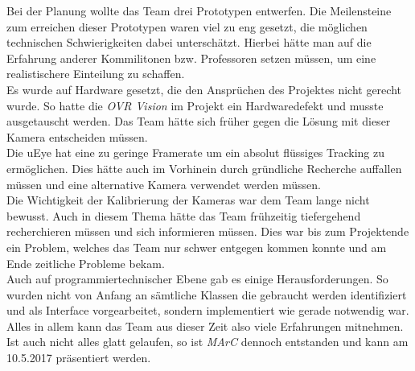 Bei der Planung wollte das Team drei Prototypen entwerfen. Die Meilensteine zum erreichen dieser Prototypen waren viel zu eng gesetzt, die möglichen technischen Schwierigkeiten dabei unterschätzt. Hierbei hätte man auf die Erfahrung anderer Kommilitonen bzw. Professoren setzen müssen, um eine realistischere Einteilung zu schaffen.\\
Es wurde auf Hardware gesetzt, die den Ansprüchen des Projektes nicht gerecht wurde. So hatte die \textit{OVR Vision} im Projekt ein Hardwaredefekt und musste ausgetauscht werden. Das Team hätte sich früher gegen die Lösung mit dieser Kamera entscheiden müssen.\\
Die uEye hat eine zu geringe Framerate um ein absolut flüssiges Tracking zu ermöglichen. Dies hätte auch im Vorhinein durch gründliche Recherche auffallen müssen und eine alternative Kamera verwendet werden müssen.\\
Die Wichtigkeit der Kalibrierung der Kameras war dem Team lange nicht bewusst. Auch in diesem Thema hätte das Team frühzeitig tiefergehend recherchieren müssen und sich informieren müssen. Dies war bis zum Projektende ein Problem, welches das Team nur schwer entgegen kommen konnte und am Ende zeitliche Probleme bekam.\\
Auch auf programmiertechnischer Ebene gab es einige Herausforderungen. So wurden nicht von Anfang an sämtliche Klassen die gebraucht werden identifiziert und als Interface vorgearbeitet, sondern implementiert wie gerade notwendig war. \\
Alles in allem kann das Team aus dieser Zeit also viele Erfahrungen mitnehmen. Ist auch nicht alles glatt gelaufen, so ist \textit{MArC} dennoch entstanden und kann am 10.5.2017 präsentiert werden.


























